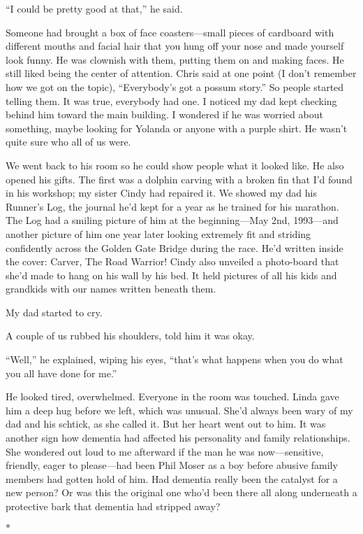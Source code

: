 \documentclass[12pt]{book}
\begin{document}
``I could be pretty good at that,'' he said.

Someone had brought a box of face coasters---small pieces of cardboard with different mouths and facial hair that you hung off your nose and made yourself look funny. He was clownish with them, putting them on and making faces. He still liked being the center of attention. Chris said at one point (I don't remember how we got on the topic), ``Everybody's got a possum story.'' So people started telling them. It was true, everybody had one. I noticed my dad kept checking behind him toward the main building. I wondered if he was worried about something, maybe looking for Yolanda or anyone with a purple shirt. He wasn't quite sure who all of us were.

We went back to his room so he could show people what it looked like. He also opened his gifts. The first was a dolphin carving with a broken fin that I'd found in his workshop; my sister Cindy had repaired it. We showed my dad his Runner's Log, the journal he'd kept for a year as he trained for his marathon. The Log had a smiling picture of him at the beginning---May 2nd, 1993---and another picture of him one year later looking extremely fit and striding confidently across the Golden Gate Bridge during the race. He'd written inside the cover: Carver, The Road Warrior! Cindy also unveiled a photo-board that she'd made to hang on his wall by his bed. It held pictures of all his kids and grandkids with our names written beneath them.

My dad started to cry.

A couple of us rubbed his shoulders, told him it was okay.

``Well,'' he explained, wiping his eyes, ``that's what happens when you do what you all have done for me.''

He looked tired, overwhelmed. Everyone in the room was touched. Linda gave him a deep hug before we left, which was unusual. She'd always been wary of my dad and his schtick, as she called it. But her heart went out to him. It was another sign how dementia had affected his personality and family relationships. She wondered out loud to me afterward if the man he was now---sensitive, friendly, eager to please---had been Phil Moser as a boy before abusive family members had gotten hold of him. Had dementia really been the catalyst for a new person? Or was this the original one who'd been there all along underneath a protective bark that dementia had stripped away?

\begin{center}$*$\end{center}
\end{document}
